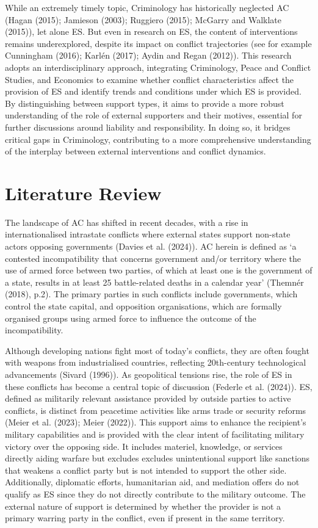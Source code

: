 \documentclass[
]{article}
\begin{document}
While an extremely timely topic, Criminology has historically neglected
AC (Hagan (2015); Jamieson (2003); Ruggiero (2015); McGarry and Walklate
(2015)), let alone ES. But even in research on ES, the content of
interventions remains underexplored, despite its impact on conflict
trajectories (see for example Cunningham (2016); Karlén (2017); Aydin
and Regan (2012)). This research adopts an interdisciplinary approach,
integrating Criminology, Peace and Conflict Studies, and Economics to
examine whether conflict characteristics affect the provision of ES and
identify trends and conditions under which ES is provided. By
distinguishing between support types, it aims to provide a more robust
understanding of the role of external supporters and their motives,
essential for further discussions around liability and responsibility.
In doing so, it bridges critical gaps in Criminology, contributing to a
more comprehensive understanding of the interplay between external
interventions and conflict dynamics.

\section{Literature Review}\label{literature-review}

The landscape of AC has shifted in recent decades, with a rise in
internationalised intrastate conflicts where external states support
non-state actors opposing governments (Davies et al. (2024)). AC herein
is defined as `a contested incompatibility that concerns government
and/or territory where the use of armed force between two parties, of
which at least one is the government of a state, results in at least 25
battle-related deaths in a calendar year' (Themnér (2018), p.2). The
primary parties in such conflicts include governments, which control the
state capital, and opposition organisations, which are formally
organised groups using armed force to influence the outcome of the
incompatibility.

Although developing nations fight most of today's conflicts, they are
often fought with weapons from industrialised countries, reflecting
20th-century technological advancements (Sivard (1996)). As geopolitical
tensions rise, the role of ES in these conflicts has become a central
topic of discussion (Federle et al. (2024)). ES, defined as militarily
relevant assistance provided by outside parties to active conflicts, is
distinct from peacetime activities like arms trade or security reforms
(Meier et al. (2023); Meier (2022)). This support aims to enhance the
recipient's military capabilities and is provided with the clear intent
of facilitating military victory over the opposing side. It includes
materiel, knowledge, or services directly aiding warfare but excludes
excludes unintentional support like sanctions that weakens a conflict
party but is not intended to support the other side. Additionally,
diplomatic efforts, humanitarian aid, and mediation offers do not
qualify as ES since they do not directly contribute to the military
outcome. The external nature of support is determined by whether the
provider is not a primary warring party in the conflict, even if present
in the same territory.
\end{document}
